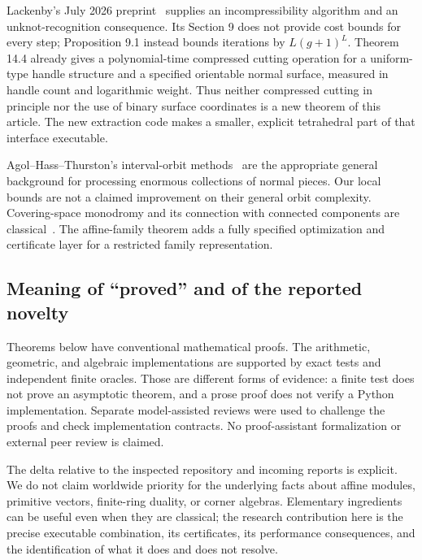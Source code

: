 Lackenby's July 2026 preprint~\cite{lackenby2026} supplies an
incompressibility algorithm and an unknot-recognition consequence. Its
Section 9 does not provide cost bounds for every step; Proposition 9.1
instead bounds iterations by $L(g+1)^L$. Theorem 14.4 already gives a
polynomial-time compressed cutting operation for a uniform-type handle
structure and a specified orientable normal surface, measured in handle
count and logarithmic weight. Thus neither compressed cutting in principle
nor the use of binary surface coordinates is a new theorem of this
article. The new extraction code makes a smaller, explicit tetrahedral
part of that interface executable.

Agol--Hass--Thurston's interval-orbit methods~\cite{aht} are the appropriate
general background for processing enormous collections of normal pieces.
Our local bounds are not a claimed improvement on their general orbit
complexity. Covering-space monodromy and its connection with connected
components are classical~\cite{hatcher}. The affine-family theorem adds
a fully specified optimization and certificate layer for a restricted
family representation.

\subsection{Meaning of ``proved'' and of the reported novelty}

Theorems below have conventional mathematical proofs. The arithmetic,
geometric, and algebraic implementations are supported by exact tests and
independent finite oracles. Those are different forms of evidence: a
finite test does not prove an asymptotic theorem, and a prose proof does
not verify a Python implementation. Separate model-assisted reviews were
used to challenge the proofs and check implementation contracts. No
proof-assistant formalization or external peer review is claimed.

The delta relative to the inspected repository and incoming reports is
explicit. We do not claim worldwide priority for the underlying facts
about affine modules, primitive vectors, finite-ring duality, or corner
algebras. Elementary ingredients can be useful even when they are
classical; the research contribution here is the precise executable
combination, its certificates, its performance consequences, and the
identification of what it does and does not resolve.
